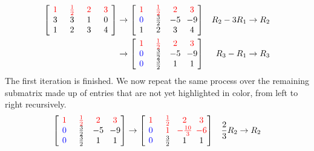 \begin{solution}
\begin{align*}
\left[\begin{array}{@{\,}wc{10pt}wc{10pt}wc{10pt}wc{10pt}@{\,}}
\mathcolor{red}{1} & \mathcolor{red}{\frac{1}{2}} & \mathcolor{red}{2} & \mathcolor{red}{3} \\
3 & 3 & 1 & 0 \\
1 & 2 & 3 & 4
\end{array}\right]
&\to
\left[\begin{array}{@{\,}wc{10pt}wc{10pt}wc{10pt}wc{10pt}@{\,}}
\mathcolor{red}{1} & \mathcolor{red}{\frac{1}{2}} & \mathcolor{red}{2} & \mathcolor{red}{3} \\
\mathcolor{blue}{0} & \frac{3}{2} & -5 & -9 \\
1 & 2 & 3 & 4
\end{array}\right]
& R_2-3R_1 \to R_2 \\
&\to
\left[\begin{array}{@{\,}wc{10pt}wc{10pt}wc{10pt}wc{10pt}@{\,}}
\mathcolor{red}{1} & \mathcolor{red}{\frac{1}{2}} & \mathcolor{red}{2} & \mathcolor{red}{3} \\
\mathcolor{blue}{0} & \frac{3}{2} & -5 & -9 \\
\mathcolor{blue}{0} & \frac{3}{2} & 1 & 1
\end{array}\right]
& R_3-R_1 \to R_3
\end{align*}
The first iteration is finished. We now repeat the same process over the remaining submatrix made up of entries that are not yet highlighted in color, from left to right recursively.
\begin{align*}
\left[\begin{array}{@{\,}wc{10pt}wc{10pt}wc{10pt}wc{10pt}@{\,}}
\mathcolor{red}{1} & \mathcolor{red}{\frac{1}{2}} & \mathcolor{red}{2} & \mathcolor{red}{3} \\
\mathcolor{blue}{0} & \frac{3}{2} & -5 & -9 \\
\mathcolor{blue}{0} & \frac{3}{2} & 1 & 1
\end{array}\right]
&\to
\left[\begin{array}{@{\,}wc{10pt}wc{10pt}wc{10pt}wc{10pt}@{\,}}
\mathcolor{red}{1} & \mathcolor{red}{\frac{1}{2}} & \mathcolor{red}{2} & \mathcolor{red}{3} \\
\mathcolor{blue}{0} & \mathcolor{red}{1} & \mathcolor{red}{-\frac{10}{3}} & \mathcolor{red}{-6} \\
\mathcolor{blue}{0} & \frac{3}{2} & 1 & 1
\end{array}\right]
& \frac{2}{3}R_2 \to R_2 \\

\end{align*}
\end{solution}
